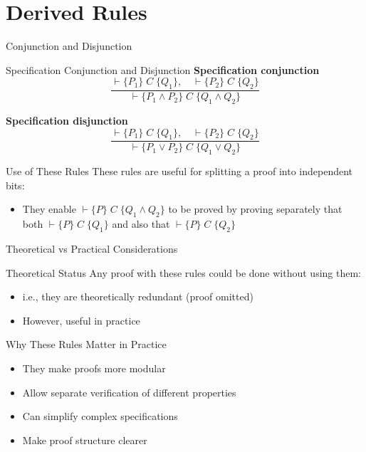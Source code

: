\section{Derived Rules}

\begin{frame}{Conjunction and Disjunction}
    \begin{block}{Specification Conjunction and Disjunction}
        \textbf{Specification conjunction}
        \[ \frac{\vdash \{P_1\} \; C \; \{Q_1\}, \quad \vdash \{P_2\} \; C \; \{Q_2\}}{\vdash \{P_1 \wedge P_2\} \; C \; \{Q_1 \wedge Q_2\}} \]
        
        \textbf{Specification disjunction}
        \[ \frac{\vdash \{P_1\} \; C \; \{Q_1\}, \quad \vdash \{P_2\} \; C \; \{Q_2\}}{\vdash \{P_1 \vee P_2\} \; C \; \{Q_1 \vee Q_2\}} \]
    \end{block}
    
    \begin{block}{Use of These Rules}
        These rules are useful for splitting a proof into independent bits:
        \begin{itemize}
            \item They enable $\vdash \{P\} \; C \; \{Q_1 \wedge Q_2\}$ to be proved by proving separately that both $\vdash \{P\} \; C \; \{Q_1\}$ and also that $\vdash \{P\} \; C \; \{Q_2\}$
        \end{itemize}
    \end{block}
\end{frame}

\begin{frame}{Theoretical vs Practical Considerations}
    \begin{block}{Theoretical Status}
        Any proof with these rules could be done without using them:
        \begin{itemize}
            \item i.e., they are theoretically redundant (proof omitted)
            \item However, useful in practice
        \end{itemize}
    \end{block}
    
    \begin{block}{Why These Rules Matter in Practice}
        \begin{itemize}
            \item They make proofs more modular
            \item Allow separate verification of different properties
            \item Can simplify complex specifications
            \item Make proof structure clearer
        \end{itemize}
    \end{block}
\end{frame}

